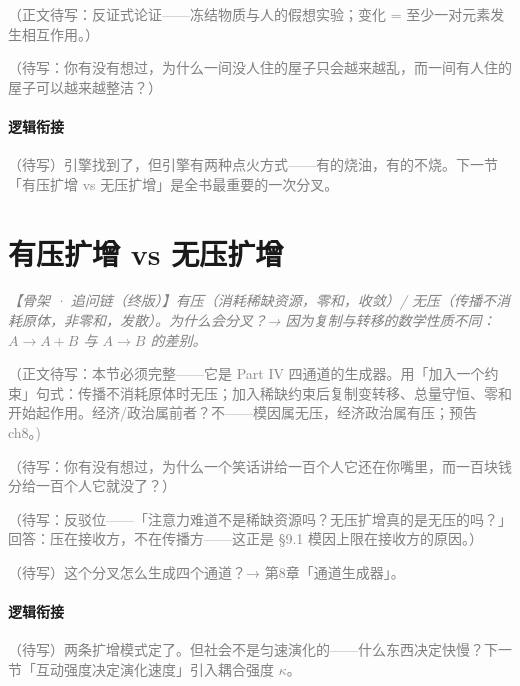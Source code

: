 \documentclass[../../main2.tex]{subfiles}
\begin{document}
	\textcolor{gray}{（正文待写：反证式论证——冻结物质与人的假想实验；变化 = 至少一对元素发生相互作用。）}

	\begin{readingnote}
		\textcolor{gray}{（待写：你有没有想过，为什么一间没人住的屋子只会越来越乱，而一间有人住的屋子可以越来越整洁？）}
	\end{readingnote}

	\paragraph*{逻辑衔接}
	\textcolor{gray}{（待写）引擎找到了，但引擎有两种点火方式——有的烧油，有的不烧。下一节「有压扩增 vs 无压扩增」是全书最重要的一次分叉。}

	\section{有压扩增 vs 无压扩增}
	\label{sec:evo-pressure}

	\textcolor{gray}{\textit{【骨架 · 追问链（终版）】有压（消耗稀缺资源，零和，收敛）/ 无压（传播不消耗原体，非零和，发散）。为什么会分叉？→ 因为复制与转移的数学性质不同：$A \to A + B$ 与 $A \to B$ 的差别。}}

	\textcolor{gray}{（正文待写：本节必须完整——它是 Part IV 四通道的生成器。用「加入一个约束」句式：传播不消耗原体时无压；加入稀缺约束后复制变转移、总量守恒、零和开始起作用。经济/政治属前者？不——模因属无压，经济政治属有压；预告 ch8。)}

	\begin{readingnote}
		\textcolor{gray}{（待写：你有没有想过，为什么一个笑话讲给一百个人它还在你嘴里，而一百块钱分给一百个人它就没了？）}
	\end{readingnote}

	\begin{questionbox}
		\textcolor{gray}{（待写：反驳位——「注意力难道不是稀缺资源吗？无压扩增真的是无压的吗？」回答：压在接收方，不在传播方——这正是 §9.1 模因上限在接收方的原因。）}
	\end{questionbox}

	\begin{reader_anticipation}
		\item \textcolor{gray}{（待写）这个分叉怎么生成四个通道？→ 第8章「通道生成器」。}
	\end{reader_anticipation}

	\paragraph*{逻辑衔接}
	\textcolor{gray}{（待写）两条扩增模式定了。但社会不是匀速演化的——什么东西决定快慢？下一节「互动强度决定演化速度」引入耦合强度 $\kappa$。}
\end{document}
